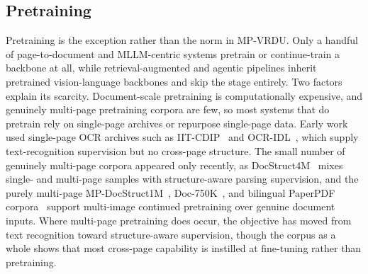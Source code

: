 \documentclass[11pt]{article}
\begin{document}

\subsection{Pretraining}
\label{app:dataset-pt}
Pretraining is the exception rather than the norm in MP-VRDU. Only a handful of page-to-document and MLLM-centric systems pretrain or continue-train a backbone at all, while retrieval-augmented and agentic pipelines inherit pretrained vision-language backbones and skip the stage entirely. Two factors explain its scarcity. Document-scale pretraining is computationally expensive, and genuinely multi-page pretraining corpora are few, so most systems that do pretrain rely on single-page archives or repurpose single-page data. Early work used single-page OCR archives such as IIT-CDIP~\cite{lewis2006iitcdip} and OCR-IDL~\cite{biten2022ocridl}, which supply text-recognition supervision but no cross-page structure. The small number of genuinely multi-page corpora appeared only recently, as DocStruct4M~\cite{hu2024mplug} mixes single- and multi-page samples with structure-aware parsing supervision, and the purely multi-page MP-DocStruct1M~\cite{hu2025mplug2}, Doc-750K~\cite{duan2025docopilot}, and bilingual PaperPDF corpora~\cite{xie2026wukong} support multi-image continued pretraining over genuine document inputs. Where multi-page pretraining does occur, the objective has moved from text recognition toward structure-aware supervision, though the corpus as a whole shows that most cross-page capability is instilled at fine-tuning rather than pretraining.
\end{document}
